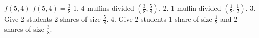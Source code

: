 $f(5,4)$
$f(5,4)=\frac{3}{8}$
1. 4 muffins divided $(\frac{3}{8}, \frac{5}{8})$.
2. 1 muffin divided $(\frac{1}{2}, \frac{1}{2})$.
3. Give 2 students 2 shares of size $\frac{5}{8}$.
4. Give 2 students 1 share of size $\frac{1}{2}$ and 2 shares of size $\frac{3}{8}$.
